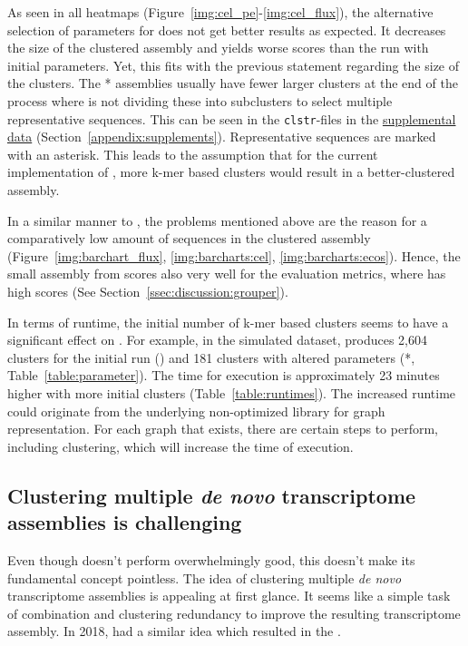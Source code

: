 \documentclass[12pt,a4paper,english]{article}
\begin{document}
	As seen in all heatmaps (Figure~\ref{img:cel_pe}-\ref{img:cel_flux}), the alternative selection of parameters for \karma does not get better results as expected. It decreases the size of the clustered assembly and yields worse scores than the run with initial parameters. Yet, this fits with the previous statement regarding the size of the clusters. The \karma{}* assemblies usually have fewer larger clusters at the end of the process where \mcl is not dividing these into subclusters to select multiple representative sequences. This can be seen in the \texttt{clstr}-files in the \href{https://github.com/lmfaber/master_thesis/blob/master/supplemental_data/clusterings/clusterings.txt}{supplemental data} (Section~\ref{appendix:supplements}). Representative sequences are marked with an asterisk.
	This leads to the assumption that for the current implementation of \karma, more k-mer based clusters would result in a better-clustered assembly.
	
	In a similar manner to \grouper, the problems mentioned above are the reason for a comparatively low amount of sequences in the clustered assembly (Figure~\ref{img:barchart_flux}, \ref{img:barcharts:cel}, \ref{img:barcharts:ecos}). Hence, the small assembly from \karma scores also very well for the evaluation metrics, where \grouper has high scores (See Section~\ref{ssec:discussion:grouper}).
	
	In terms of runtime, the initial number of k-mer based clusters seems to have a significant effect on \karma. 
	For example, in the simulated dataset, \hdbscan produces 2,604 clusters for the initial run (\karma) and 181 clusters with altered parameters (\karma{}*, Table~\ref{table:parameter}). The time for execution is approximately 23 minutes higher with more initial clusters (Table~\ref{table:runtimes}). The increased runtime could originate from the underlying non-optimized library for graph representation. For each graph that exists, there are certain steps to perform, including \mcl clustering, which will increase the time of execution.
	
	\subsection{Clustering multiple \textit{de novo} transcriptome assemblies is challenging}
	    Even though \karma doesn't perform overwhelmingly good, this doesn't make its fundamental concept pointless.
		The idea of clustering multiple \textit{de novo} transcriptome assemblies is appealing at first glance. It seems like a simple task of combination and clustering redundancy to improve the resulting transcriptome assembly. In 2018, \citeauthor{OysterRiverProtocol:18} had a similar idea which resulted in the \orp \citep{OysterRiverProtocol:18}.
		
\end{document}
